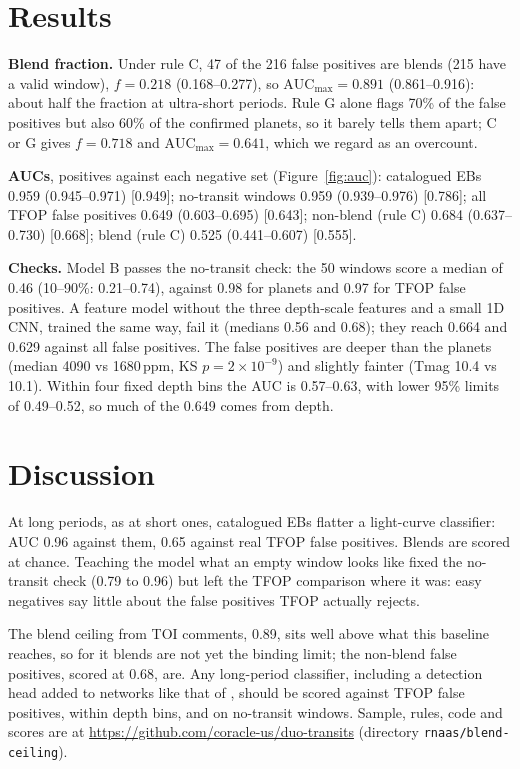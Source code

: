 \documentclass{aastex701}
\begin{document}
\section{Results}

\textbf{Blend fraction.} Under rule C, 47 of the 216 false positives are blends (215 have a valid window),
$f=0.218$ (0.168--0.277), so $\mathrm{AUC_{max}}=0.891$ (0.861--0.916): about half the fraction at ultra-short
periods. Rule G alone flags 70\% of the false positives but also 60\% of the confirmed planets, so it barely tells
them apart; C or G gives $f=0.718$ and $\mathrm{AUC_{max}}=0.641$, which we regard as an overcount.

\textbf{AUCs}, positives against each negative set (Figure~\ref{fig:auc}): catalogued EBs 0.959 (0.945--0.971)
[0.949]; no-transit windows 0.959 (0.939--0.976) [0.786]; all TFOP false positives 0.649 (0.603--0.695) [0.643];
non-blend (rule C) 0.684 (0.637--0.730) [0.668]; blend (rule C) 0.525 (0.441--0.607) [0.555].

\textbf{Checks.} Model B passes the no-transit check: the 50 windows score a median of 0.46 (10--90\%: 0.21--0.74),
against 0.98 for planets and 0.97 for TFOP false positives. A feature model without the three depth-scale features
and a small 1D CNN, trained the same way, fail it (medians 0.56 and 0.68); they reach 0.664 and 0.629 against all
false positives. The false positives are deeper than the planets (median 4090 vs 1680\,ppm, KS $p=2\times10^{-9}$)
and slightly fainter (Tmag 10.4 vs 10.1). Within four fixed depth bins the AUC is 0.57--0.63, with lower 95\% limits
of 0.49--0.52, so much of the 0.649 comes from depth.

\section{Discussion}

At long periods, as at short ones, catalogued EBs flatter a light-curve classifier: AUC 0.96 against them, 0.65
against real TFOP false positives. Blends are scored at chance. Teaching the model what an empty window looks like
fixed the no-transit check (0.79 to 0.96) but left the TFOP comparison where it was: easy negatives say little about
the false positives TFOP actually rejects.

The blend ceiling from TOI comments, 0.89, sits well above what this baseline reaches, so for it blends are not yet
the binding limit; the non-blend false positives, scored at 0.68, are. Any long-period classifier, including a
detection head added to networks like that of \citet{Salinas2026}, should be scored against TFOP false positives,
within depth bins, and on no-transit windows. Sample, rules, code and scores are at
\url{https://github.com/coracle-us/duo-transits} (directory \texttt{rnaas/blend-ceiling}).
\end{document}
